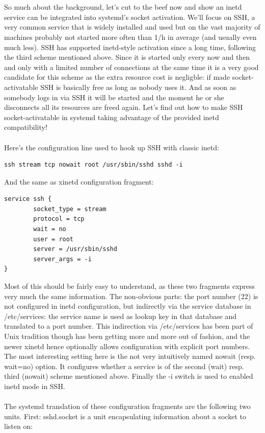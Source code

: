 \documentclass[titlepage]{article}
\begin{document}
\\
\\
So much about the background, let's cut to the beef now and show an inetd service can be integrated into systemd's socket activation. We'll focus on SSH, a very common service that is widely installed and used but on the vast majority of machines probably not started more often than 1/h in average (and usually even much less). SSH has supported inetd-style activation since a long time, following the third scheme mentioned above. Since it is started only every now and then and only with a limited number of connections at the same time it is a very good candidate for this scheme as the extra resource cost is negligble: if made socket-activatable SSH is basically free as long as nobody uses it. And as soon as somebody logs in via SSH it will be started and the moment he or she disconnects all its resources are freed again. Let's find out how to make SSH socket-activatable in systemd taking advantage of the provided inetd compatibility!
\\
\\
Here's the configuration line used to hook up SSH with classic inetd:
\begin{lstlisting}
ssh stream tcp nowait root /usr/sbin/sshd sshd -i
\end{lstlisting}
And the same as xinetd configuration fragment:
\begin{lstlisting}
service ssh {
        socket_type = stream
        protocol = tcp
        wait = no
        user = root
        server = /usr/sbin/sshd
        server_args = -i
}
\end{lstlisting}
Most of this should be fairly easy to understand, as these two fragments express very much the same information. The non-obvious parts: the port number (22) is not configured in inetd configuration, but indirectly via the service database in /etc/services: the service name is used as lookup key in that database and translated to a port number. This indirection via /etc/services has been part of Unix tradition though has been getting more and more out of fashion, and the newer xinetd hence optionally allows configuration with explicit port numbers. The most interesting setting here is the not very intuitively named nowait (resp. wait=no) option. It configures whether a service is of the second (wait) resp. third (nowait) scheme mentioned above. Finally the -i switch is used to enabled inetd mode in SSH.
\\
\\
The systemd translation of these configuration fragments are the following two units. First: sshd.socket is a unit encapsulating information about a socket to listen on:
\end{document}
